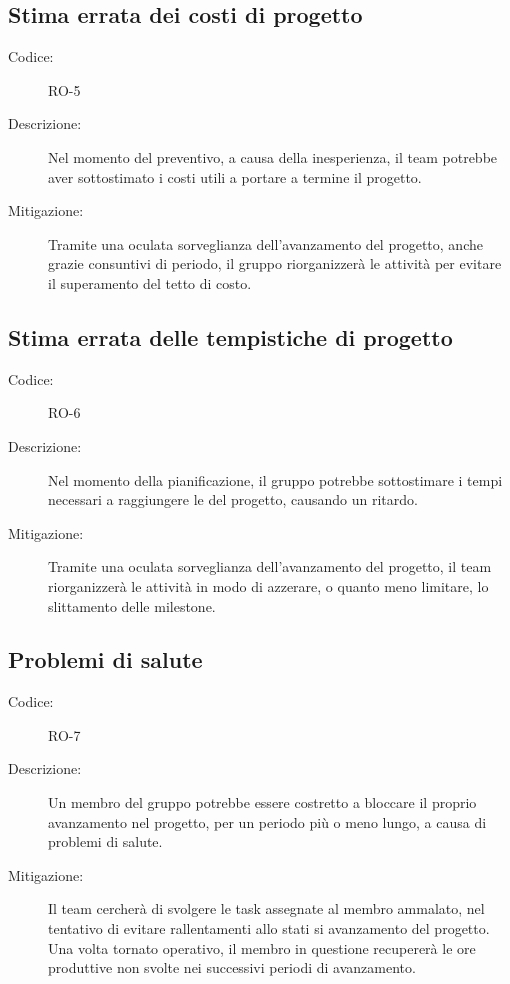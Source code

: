 \subsection*{Stima errata dei costi di progetto}
\begin{description}
    \item[Codice:] RO-5
    \item[Descrizione:] Nel momento del preventivo, a causa della inesperienza, il team potrebbe aver sottostimato i costi utili a portare a termine il progetto.
    \item[Mitigazione:] Tramite una oculata sorveglianza dell'avanzamento del progetto, anche grazie  consuntivi di periodo, il gruppo riorganizzerà le attività per evitare il superamento del tetto di costo.
\end{description}

\subsection*{Stima errata delle tempistiche di progetto}
\begin{description}
    \item[Codice:] RO-6
    \item[Descrizione:] Nel momento della pianificazione, il gruppo potrebbe sottostimare i tempi necessari a raggiungere le  del progetto, causando un ritardo.
    \item[Mitigazione:] Tramite una oculata sorveglianza dell'avanzamento del progetto, il team riorganizzerà le attività in modo di azzerare, o quanto meno limitare, lo slittamento delle milestone.
\end{description}

\subsection*{Problemi di salute}
\begin{description}
    \item[Codice:] RO-7
    \item[Descrizione:] Un membro del gruppo potrebbe essere costretto a bloccare il proprio avanzamento nel progetto, per un periodo più o meno lungo, a causa di problemi di salute.
    \item[Mitigazione:] Il team cercherà di svolgere le task assegnate al membro ammalato, nel tentativo di evitare rallentamenti allo stati si avanzamento del progetto. Una volta tornato operativo, il membro in questione recupererà le ore produttive non svolte nei successivi periodi di avanzamento.
\end{description}


